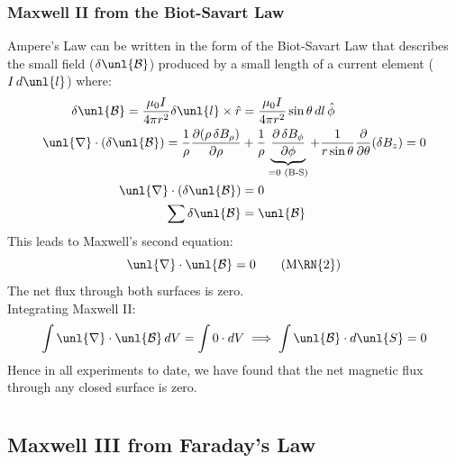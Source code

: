 \documentclass[a4paper, 11pt, normalem]{report}
\newcommand\p{\partial}
\newcommand\B{\mathcal{B}}
\newcommand\uB{\unl{\B}}
\newcommand\del{\unl{\nabla}}
\newcommand\hr{\hat{r}}
\begin{document}
\subsection{Maxwell \RN{2} from the Biot-Savart Law}
Ampere's Law can be written in the form of the Biot-Savart Law that describes the small field ($\delta\uB$) produced by a small length of a current element ($I\,d\unl{l}$) where:
\begin{align*}
    \delta \uB = \frac{\mu_0 I}{4\pi r^2}\delta\unl{l} \times \hr &= \frac{\mu_0 I}{4\pi r^2}\sin\theta\,dl\,\hat{\phi} \\
    \del \cdot (\delta\uB) = \frac{1}{\rho}\frac{\p(\rho\,\delta B_\rho)}{\p \rho} &+ \frac{1}{\rho}\underbrace{\frac{\p\, \delta B_\phi}{\p \phi}}_{= 0 \text{ (B-S)}} + \frac{1}{r\sin\theta} \frac{\p}{\p \theta}(\delta B_z) = 0 \\
    \del\cdot(\delta\uB) &= 0 \\
    \sum \delta\uB &= \uB
\end{align*}
This leads to Maxwell's second equation:
\begin{equation}
    \del\cdot\uB = 0 \tag{M\RN{2}}
\end{equation}
The net flux through both surfaces is zero. \\
Integrating Maxwell \RN{2}:
\begin{equation*}
    \int \del\cdot\uB\,dV = \int 0\cdot dV \implies \int \uB\cdot d\unl{S} = 0
\end{equation*}
Hence in all experiments to date, we have found that the net magnetic flux through any closed surface is zero.

\chapter{}
\section{Maxwell \RN{3} from Faraday's Law}
\end{document}
